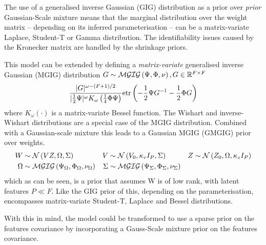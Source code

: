 The use of a generalised inverse Gaussian (GIG) distribution as a prior over \emph{prior} Gaussian-Scale mixture means that the marginal distribution over the weight matrix -- depending on its inferred parameterisation -- can be a matrix-variate Laplace, Student-T or Gamma distribution. The identifiability issues caused by the Kronecker matrix are handled by the shrinkage priors.

This model can be extended\cite{Yang2011} by defining a \emph{matrix-variate} generalised inverse Gaussian (MGIG) distribution $G\sim \mathcal{MGIG}\left(\Psi, \Phi, \nu\right), G \in { \mathbb{R}^{F \times F} }$
\begin{align}
\frac{|G|^{\omega - (F + 1)/2}}{|\frac{1}{2} \Psi|^\omega K_\omega \left(\frac{1}{4}\Phi \Psi\right)} \text{etr}\left( -\frac{1}{2} \Psi {G}^{-1} - \frac{1}{2} \Phi G \right)
\end{align}
where $K_\omega(\cdot)$ is a matrix-variate Bessel function. The Wishart and inverse-Wishart distributions are a special case of the MGIG distribution. Combined with a Gaussian-scale mixture this leads to a Gaussian MGIG (GMGIG) prior over weights.
\begin{align}
W & \sim \mathcal{N} \left(VZ, \Omega, \Sigma\right) &
V & \sim \mathcal{N} \left(V_0, \kappa_v I_P, \Sigma\right) &
Z & \sim \mathcal{N} \left(Z_0, \Omega, \kappa_z I_P\right) \\
\Omega & \sim \mathcal{MGIG}\left( \Psi_\Omega, \Phi_\Omega, \nu_\Omega \right) &
\Sigma & \sim \mathcal{MGIG}\left( \Psi_\Sigma, \Phi_\Sigma, \nu_\Sigma \right) &
\end{align}
which as can be seen, is a prior that assumes W is of low rank, with latent features $P \ll F$. Like the GIG prior of this, depending on the parameterisation, encompasses matrix-variate Student-T, Laplace and Bessel distributions. 

With this in mind, the model could be transformed to use a sparse prior on the features covariance by incorporating a Gauss-Scale mixture prior on the features covariance.






